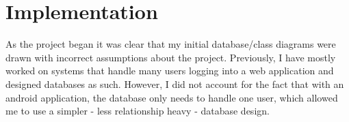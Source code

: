 \chapter{Implementation}

As the project began it was clear that my initial database/class diagrams were drawn with incorrect assumptions about the project. 
Previously, I have mostly worked on systems that handle many users logging into a web application and designed databases as such. 
However, I did not account for the fact that with an android application, the database only needs to handle one user, which allowed me to use a simpler - less relationship heavy - database design.